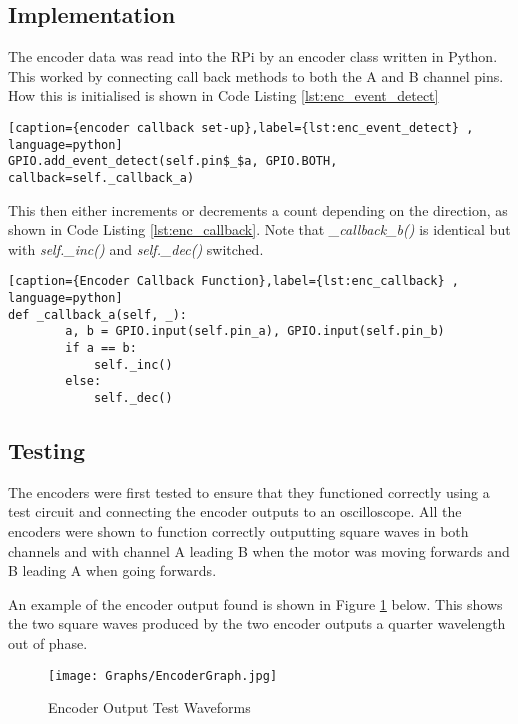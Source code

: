 \subsection{Implementation}\label{elec/encoder/impl}

The encoder data was read into the RPi by an encoder class written in Python. This worked by connecting call back methods to both the A and B channel pins. How this is initialised is shown in Code Listing \ref{lst:enc_event_detect}


\begin{lstlisting}[caption={encoder callback set-up},label={lst:enc_event_detect} , language=python]
GPIO.add_event_detect(self.pin$_$a, GPIO.BOTH, callback=self._callback_a)
\end{lstlisting}

This then either increments or decrements a count depending on the direction, as shown in Code Listing \ref{lst:enc_callback}. Note that \textit{\_callback\_b()} is identical but with \textit{self.\_inc()} and \textit{self.\_dec()} switched.

\begin{lstlisting}[caption={Encoder Callback Function},label={lst:enc_callback} , language=python]
def _callback_a(self, _):
        a, b = GPIO.input(self.pin_a), GPIO.input(self.pin_b)
        if a == b:
            self._inc()
        else:
            self._dec()
\end{lstlisting}


\subsection{Testing}\label{elec/encoder/test}
The encoders were first tested to ensure that they functioned correctly using a test circuit and connecting the encoder outputs to an oscilloscope. All the encoders were shown to function correctly outputting square waves in both channels and with channel A leading B when the motor was moving forwards and B leading A when going forwards. 

An example of the encoder output found is shown in Figure 
\ref{EncoderGraph} below. This shows the two square waves produced by the 
two encoder outputs a quarter wavelength out of phase.

\begin{figure}[!ht]
	\centering
	\texttt{[image: Graphs/EncoderGraph.jpg]}
	\caption{Encoder Output Test Waveforms}\label{EncoderGraph}

\end{figure}


